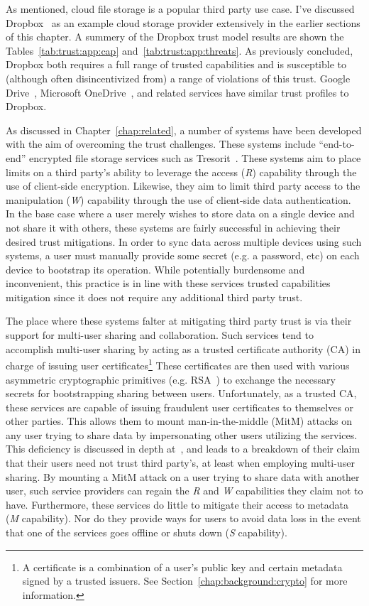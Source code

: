 As mentioned, cloud file storage is a popular third party use
case. I've discussed Dropbox~\cite{dropbox} as an example cloud
storage provider extensively in the earlier sections of this
chapter. A summery of the Dropbox trust model results are shown the
Tables~\ref{tab:trust:app:cap} and~\ref{tab:trust:app:threats}. As
previously concluded, Dropbox both requires a full range of trusted
capabilities and is susceptible to (although often disincentivized
from) a range of violations of this trust. Google
Drive~\cite{google-drive}, Microsoft
OneDrive~\cite{microsoft-onedrive}, and related services have similar
trust profiles to Dropbox.

As discussed in Chapter~\ref{chap:related}, a number of systems have
been developed with the aim of overcoming the trust challenges. These
systems include ``end-to-end'' encrypted file storage services such as
Tresorit~\cite{tresorit}. These systems aim to place limits on a third
party's ability to leverage the access (\emph{R}) capability through
the use of client-side encryption. Likewise, they aim to limit third
party access to the manipulation (\emph{W}) capability through the use
of client-side data authentication. In the base case where a user
merely wishes to store data on a single device and not share it with
others, these systems are fairly successful in achieving their desired
trust mitigations. In order to sync data across multiple devices using
such systems, a user must manually provide some secret (e.g. a
password, etc) on each device to bootstrap its operation. While
potentially burdensome and inconvenient, this practice is in line with
these services trusted capabilities mitigation since it does not
require any additional third party trust.

The place where these systems falter at mitigating third party trust
is via their support for multi-user sharing and collaboration. Such
services tend to accomplish multi-user sharing by acting as a trusted
certificate authority (CA) in charge of issuing user
certificates\footnote{A certificate is a combination of a user's
  public key and certain metadata signed by a trusted issuers. See
  Section~\ref{chap:background:crypto} for more information.} These
certificates are then used with various asymmetric cryptographic
primitives (e.g. RSA~\cite{rivest1978}) to exchange the necessary
secrets for bootstrapping sharing between users. Unfortunately, as a
trusted CA, these services are capable of issuing fraudulent user
certificates to themselves or other parties. This allows them to mount
man-in-the-middle (MitM) attacks on any user trying to share data by
impersonating other users utilizing the services. This deficiency is
discussed in depth at~\cite{wilson2014}, and leads to a breakdown of
their claim that their users need not trust third party's, at least
when employing multi-user sharing. By mounting a MitM attack on a user
trying to share data with another user, such service providers can
regain the \emph{R} and \emph{W} capabilities they claim not to
have. Furthermore, these services do little to mitigate their access
to metadata (\emph{M} capability). Nor do they provide ways for users
to avoid data loss in the event that one of the services goes offline
or shuts down (\emph{S} capability).

